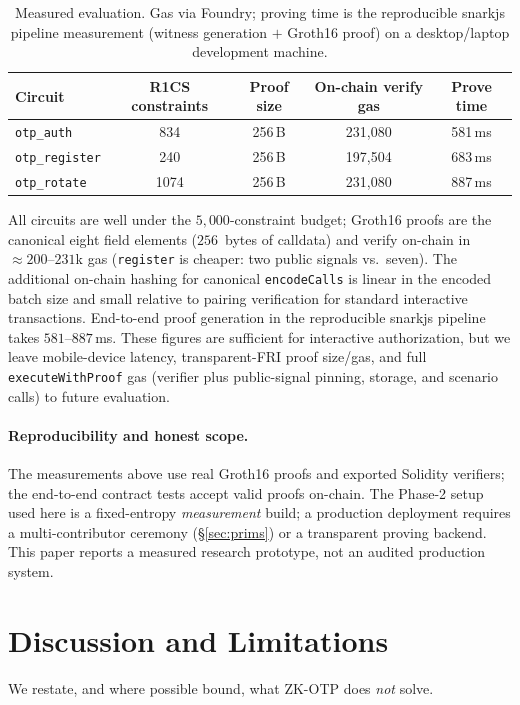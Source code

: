 \documentclass[11pt]{article}
\theoremstyle{definition}
\theoremstyle{plain}
\begin{document}
\begin{table}[t]
\centering
\caption{Measured evaluation. Gas via Foundry; proving time is the reproducible snarkjs
pipeline measurement (witness generation $+$ Groth16 proof) on a desktop/laptop
development machine.}
\label{tab:eval}
\begin{tabular}{lcccc}
\toprule
Circuit & R1CS constraints & Proof size & On-chain verify gas & Prove time \\
\midrule
\texttt{otp\_auth}     & 834  & 256\,B & 231{,}080 & 581\,ms \\
\texttt{otp\_register} & 240  & 256\,B & 197{,}504 & 683\,ms \\
\texttt{otp\_rotate}   & 1074 & 256\,B & 231{,}080 & 887\,ms \\
\bottomrule
\end{tabular}
\end{table}

All circuits are well under the $5{,}000$-constraint budget; Groth16 proofs are the
canonical eight field elements ($256$~bytes of calldata) and verify on-chain in
$\approx\!200$--$231$k gas (\texttt{register} is cheaper: two public signals vs.\
seven). The additional on-chain hashing for canonical \texttt{encodeCalls} is linear
in the encoded batch size and small relative to pairing verification for standard
interactive transactions. End-to-end proof generation in the reproducible snarkjs
pipeline takes
$581$--$887$\,ms. These figures are sufficient for interactive authorization, but
we leave mobile-device latency, transparent-FRI proof size/gas, and full
\texttt{executeWithProof} gas (verifier plus public-signal pinning, storage, and
scenario calls) to future evaluation.

\paragraph{Reproducibility and honest scope.} The measurements above use real
Groth16 proofs and exported Solidity verifiers; the end-to-end contract tests accept
valid proofs on-chain. The Phase-2 setup used here is a fixed-entropy
\emph{measurement} build; a production deployment requires a multi-contributor
ceremony (\S\ref{sec:prims}) or a transparent proving backend. This paper reports
a measured research prototype, not an audited production
system.

\section{Discussion and Limitations}
\label{sec:limits}
We restate, and where possible bound, what ZK-OTP does \emph{not} solve.
\end{document}
